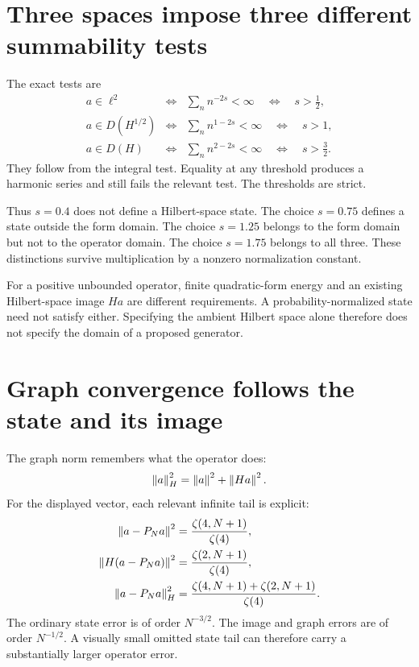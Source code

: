 \clearpage
\section{Three spaces impose three different summability tests}

The exact tests are
\[
\begin{array}{rcl}
a\in\ell^2&\Longleftrightarrow&\sum_n n^{-2s}<\infty
\quad\Longleftrightarrow\quad s>\tfrac12,\\[2pt]
a\in D(H^{1/2})&\Longleftrightarrow&\sum_n n^{1-2s}<\infty
\quad\Longleftrightarrow\quad s>1,\\[2pt]
a\in D(H)&\Longleftrightarrow&\sum_n n^{2-2s}<\infty
\quad\Longleftrightarrow\quad s>\tfrac32.
\end{array}
\]
They follow from the integral test. Equality at any threshold produces a harmonic series and still fails the relevant test. The thresholds are strict.

Thus $s=0.4$ does not define a Hilbert-space state. The choice $s=0.75$ defines a state outside the form domain. The choice $s=1.25$ belongs to the form domain but not to the operator domain. The choice $s=1.75$ belongs to all three. These distinctions survive multiplication by a nonzero normalization constant.

For a positive unbounded operator, finite quadratic-form energy and an existing Hilbert-space image $Ha$ are different requirements. A probability-normalized state need not satisfy either. Specifying the ambient Hilbert space alone therefore does not specify the domain of a proposed generator.



\clearpage
\section{Graph convergence follows the state and its image}

The graph norm remembers what the operator does:
\[
\left\lVert a\right\rVert_H^2=\left\lVert a\right\rVert^2+\left\lVert Ha\right\rVert^2.
\]
For the displayed vector, each relevant infinite tail is explicit:
\[
\begin{aligned}
\left\lVert a-P_Na\right\rVert^2&=\frac{\zeta(4,N+1)}{\zeta(4)},\\
\left\lVert H(a-P_Na)\right\rVert^2&=\frac{\zeta(2,N+1)}{\zeta(4)},\\
\left\lVert a-P_Na\right\rVert_H^2&=\frac{\zeta(4,N+1)+\zeta(2,N+1)}{\zeta(4)}.
\end{aligned}
\]
The ordinary state error is of order $N^{-3/2}$. The image and graph errors are of order $N^{-1/2}$. A visually small omitted state tail can therefore carry a substantially larger operator error.

